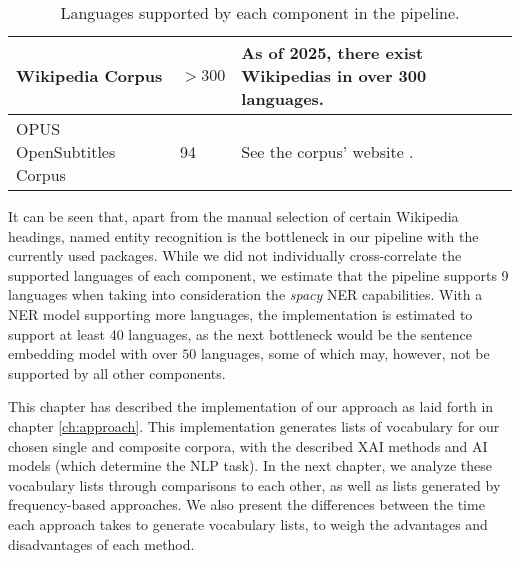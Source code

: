 {\begin{table}[H]
\begin{tabularx}{\textwidth}{|X|X|X|}
		\hline
		Wikipedia Corpus                            & $>300$                       & As of 2025, there exist Wikipedias in over 300 languages\footnotemark[8].                                                                                                                                                                   \\
		\hline
		OPUS OpenSubtitles Corpus                   & 94                           & See the corpus' website \footnotemark[9].                                                                                                                                                                                                                       \\
		\hline
	\end{tabularx}



	\caption{Languages supported by each component in the pipeline.}
	\label{table:supported-languages}
\end{table}
}


It can be seen that, apart from the manual selection of certain Wikipedia headings, named entity recognition is the bottleneck in our pipeline with the currently used packages.
While we did not individually cross-correlate the supported languages of each component, we estimate that the pipeline supports 9 languages when taking into consideration the \textit{spacy} NER capabilities.
With a NER model supporting more languages, the implementation is estimated to support at least 40 languages, as the next bottleneck would be the sentence embedding model with over $50$ languages, some of which may, however, not be supported by all other components.

This chapter has described the implementation of our approach as laid forth in chapter \ref{ch:approach}.
This implementation generates lists of vocabulary for our chosen single and composite corpora, with the described XAI methods and AI models (which determine the NLP task).
In the next chapter, we analyze these vocabulary lists through comparisons to each other, as well as lists generated by frequency-based approaches.
We also present the differences between the time each approach takes to generate vocabulary lists, to weigh the advantages and disadvantages of each method.

